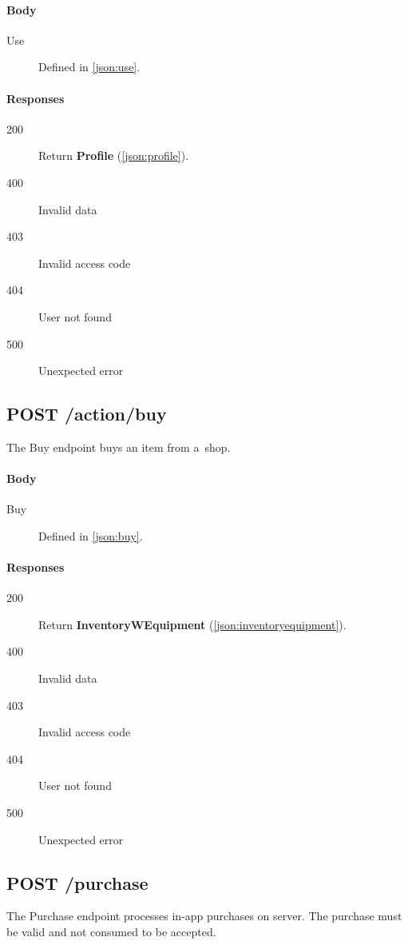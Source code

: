		\paragraph*{Body}
			\begin{description}
				\item[Use] Defined in \ref{json:use}.
			\end{description}
		\paragraph*{Responses}
			\begin{description}		
				\item[200] Return \textbf{Profile} (\ref{json:profile}).
				\item[400] Invalid data
				\item[403] Invalid access code
				\item[404] User not found
				\item[500] Unexpected error
			\end{description}
	
	\subsection{POST /action/buy}
	The Buy endpoint buys an item from a~shop.
		\paragraph*{Body}
			\begin{description}
				\item[Buy] Defined in \ref{json:buy}.
			\end{description}
		\paragraph*{Responses}
			\begin{description}		
				\item[200] Return \textbf{InventoryWEquipment} (\ref{json:inventoryequipment}).
				\item[400] Invalid data
				\item[403] Invalid access code
				\item[404] User not found
				\item[500] Unexpected error
			\end{description}
	
	\subsection{POST /purchase}
	The Purchase endpoint processes in-app purchases on server. The purchase must be valid and not consumed to be accepted.
